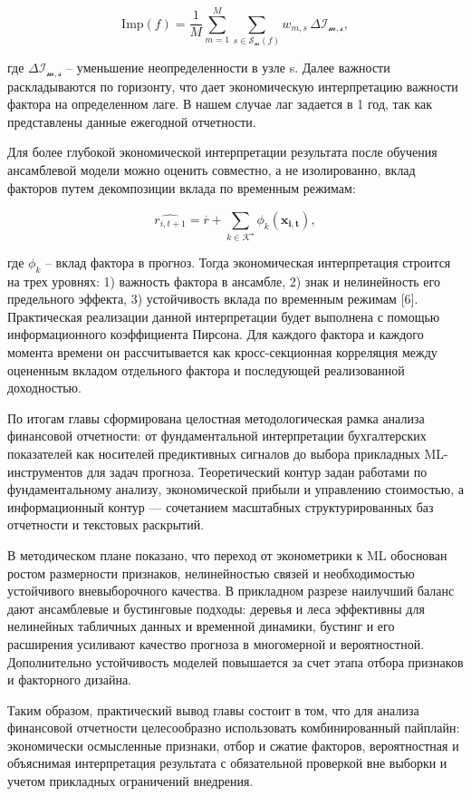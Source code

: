 \documentclass[
]{article}
\begin{document}
\[\text{Imp}(f) = \frac{1}{M}\sum_{m = 1}^{M}{\sum_{s \in \mathcal{S}_{\mathcal{m}}(f)}^{}w_{m,s}}\,\Delta\mathcal{I}_{\mathcal{m},\mathcal{s}},\]

где \(\Delta\mathcal{I}_{\mathcal{m},\mathcal{s}}\) -- уменьшение неопределенности в узле s. Далее важности раскладываются по горизонту, что дает экономическую интерпретацию важности фактора на определенном лаге. В нашем случае лаг задается в 1 год, так как представлены данные ежегодной отчетности.

Для более глубокой экономической интерпретации результата после обучения ансамблевой модели можно оценить совместно, а не изолированно, вклад факторов путем декомпозиции вклада по временным режимам:

\[\widehat{r_{i,t + 1}} = \overline{r} + \sum_{k \in \mathcal{K}^{\star}}^{}{\phi_{k}\left( \mathbf{x}_{\mathbf{i},\mathbf{t}} \right)},\]

где \(\phi_{k}\) -- вклад фактора в прогноз. Тогда экономическая интерпретация строится на трех уровнях: 1) важность фактора в ансамбле, 2) знак и нелинейность его предельного эффекта, 3) устойчивость вклада по временным режимам {[}6{]}. Практическая реализации данной интерпретации будет выполнена с помощью информационного коэффициента Пирсона. Для каждого фактора и каждого момента времени он рассчитывается как кросс-секционная корреляция между оцененным вкладом отдельного фактора и последующей реализованной доходностью.

По итогам главы сформирована целостная методологическая рамка анализа финансовой отчетности: от фундаментальной интерпретации бухгалтерских показателей как носителей предиктивных сигналов до выбора прикладных ML-инструментов для задач прогноза. Теоретический контур задан работами по фундаментальному анализу, экономической прибыли и управлению стоимостью, а информационный контур --- сочетанием масштабных структурированных баз отчетности и текстовых раскрытий.

В методическом плане показано, что переход от эконометрики к ML обоснован ростом размерности признаков, нелинейностью связей и необходимостью устойчивого вневыборочного качества. В прикладном разрезе наилучший баланс дают ансамблевые и бустинговые подходы: деревья и леса эффективны для нелинейных табличных данных и временной динамики, бустинг и его расширения усиливают качество прогноза в многомерной и вероятностной. Дополнительно устойчивость моделей повышается за счет этапа отбора признаков и факторного дизайна.

Таким образом, практический вывод главы состоит в том, что для анализа финансовой отчетности целесообразно использовать комбинированный пайплайн: экономически осмысленные признаки, отбор и сжатие факторов, вероятностная и объяснимая интерпретация результата с обязательной проверкой вне выборки и учетом прикладных ограничений внедрения.
\end{document}
